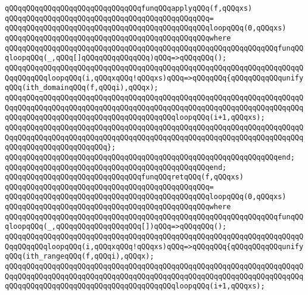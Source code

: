 \verb|qQQqqQQqqQQqqQQqqQQqqQQqqQQqqQQqfunqQQqapplyqQQq(f,qQQqxs)|\newline
\verb|qQQqqQQqqQQqqQQqqQQqqQQqqQQqqQQqqQQqqQQqqQQqqQQq=|\newline
\verb|qQQqqQQqqQQqqQQqqQQqqQQqqQQqqQQqqQQqqQQqqQQqqQQqloopqQQq(0,qQQqxs)|\newline
\verb|qQQqqQQqqQQqqQQqqQQqqQQqqQQqqQQqqQQqqQQqqQQqqQQqwhere|\newline
\verb|qQQqqQQqqQQqqQQqqQQqqQQqqQQqqQQqqQQqqQQqqQQqqQQqqQQqqQQqqQQqqQQqfunqQQqloopqQQq(_,qQQq[]qQQqqQQqqQQqqQQq)qQQq=>qQQqqQQq();|\newline
\verb|qQQqqQQqqQQqqQQqqQQqqQQqqQQqqQQqqQQqqQQqqQQqqQQqqQQqqQQqqQQqqQQqqQQqqQQqqQQqqQQqloopqQQq(i,qQQqxqQQq!qQQqxs)qQQq=>qQQqqQQq{qQQqqQQqqQQqunifyqQQq(ith_domainqQQq(f,qQQqi),qQQqx);|\newline
\verb|qQQqqQQqqQQqqQQqqQQqqQQqqQQqqQQqqQQqqQQqqQQqqQQqqQQqqQQqqQQqqQQqqQQqqQQqqQQqqQQqqQQqqQQqqQQqqQQqqQQqqQQqqQQqqQQqqQQqqQQqqQQqqQQqqQQqqQQqqQQqqQQqqQQqqQQqqQQqqQQqqQQqqQQqqQQqqQQqqQQqloopqQQq(i+1,qQQqxs);|\newline
\verb|qQQqqQQqqQQqqQQqqQQqqQQqqQQqqQQqqQQqqQQqqQQqqQQqqQQqqQQqqQQqqQQqqQQqqQQqqQQqqQQqqQQqqQQqqQQqqQQqqQQqqQQqqQQqqQQqqQQqqQQqqQQqqQQqqQQqqQQqqQQqqQQqqQQqqQQqqQQqqQQqqQQq};|\newline
\verb|qQQqqQQqqQQqqQQqqQQqqQQqqQQqqQQqqQQqqQQqqQQqqQQqqQQqqQQqqQQqqQQqend;|\newline
\verb|qQQqqQQqqQQqqQQqqQQqqQQqqQQqqQQqqQQqqQQqqQQqqQQqend;|\newline
\newline
\verb|qQQqqQQqqQQqqQQqqQQqqQQqqQQqqQQqfunqQQqretqQQq(f,qQQqxs)|\newline
\verb|qQQqqQQqqQQqqQQqqQQqqQQqqQQqqQQqqQQqqQQqqQQqqQQq=|\newline
\verb|qQQqqQQqqQQqqQQqqQQqqQQqqQQqqQQqqQQqqQQqqQQqqQQqloopqQQq(0,qQQqxs)|\newline
\verb|qQQqqQQqqQQqqQQqqQQqqQQqqQQqqQQqqQQqqQQqqQQqqQQqwhere|\newline
\verb|qQQqqQQqqQQqqQQqqQQqqQQqqQQqqQQqqQQqqQQqqQQqqQQqqQQqqQQqqQQqqQQqfunqQQqloopqQQq(_,qQQqqQQqqQQqqQQqqQQq[])qQQq=>qQQqqQQq();|\newline
\verb|qQQqqQQqqQQqqQQqqQQqqQQqqQQqqQQqqQQqqQQqqQQqqQQqqQQqqQQqqQQqqQQqqQQqqQQqqQQqqQQqloopqQQq(i,qQQqxqQQq!qQQqxs)qQQq=>qQQqqQQq{qQQqqQQqqQQqunifyqQQq(ith_rangeqQQq(f,qQQqi),qQQqx);|\newline
\verb|qQQqqQQqqQQqqQQqqQQqqQQqqQQqqQQqqQQqqQQqqQQqqQQqqQQqqQQqqQQqqQQqqQQqqQQqqQQqqQQqqQQqqQQqqQQqqQQqqQQqqQQqqQQqqQQqqQQqqQQqqQQqqQQqqQQqqQQqqQQqqQQqqQQqqQQqqQQqqQQqqQQqqQQqqQQqqQQqqQQqloopqQQq(i+1,qQQqxs);|\newline
